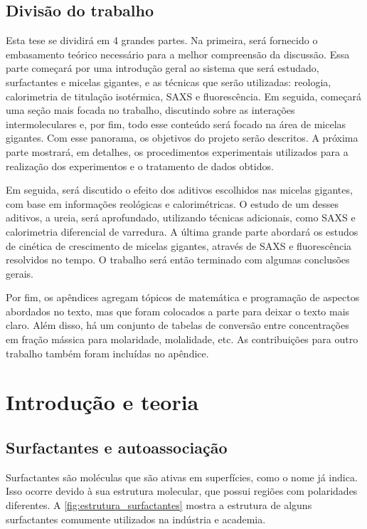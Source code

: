 
	\chapter*{Divisão do trabalho}
	
Esta tese se dividirá em 4 grandes partes. Na primeira, será fornecido o embasamento teórico necessário para a melhor compreensão da discussão. Essa parte começará por uma introdução geral ao sistema que será estudado, surfactantes e micelas gigantes, e as técnicas que serão utilizadas: reologia, calorimetria de titulação isotérmica, SAXS e fluorescência. Em seguida, começará uma seção mais focada no trabalho, discutindo sobre as interações intermoleculares e, por fim, todo esse conteúdo será focado na área de micelas gigantes. Com esse panorama, os objetivos do projeto serão descritos. A próxima parte mostrará, em detalhes, os procedimentos experimentais utilizados para a realização dos experimentos e o tratamento de dados obtidos.

Em seguida, será discutido o efeito dos aditivos escolhidos nas micelas gigantes, com base em informações reológicas e calorimétricas. O estudo de um desses aditivos, a ureia, será aprofundado, utilizando técnicas adicionais, como SAXS e calorimetria diferencial de varredura. A última grande parte abordará os estudos de cinética de crescimento de micelas gigantes, através de SAXS e fluorescência resolvidos no tempo. O trabalho será então terminado com algumas conclusões gerais.

Por fim, os apêndices agregam tópicos de matemática e programação de aspectos abordados no texto, mas que foram colocados a parte para deixar o texto mais claro. Além disso, há um conjunto de tabelas de conversão entre concentrações em fração mássica para molaridade, molalidade, etc. As contribuições para outro trabalho também foram incluídas no apêndice.

\part{Introdução e teoria}


	\chapter{Surfactantes e autoassociação}
	\label{sec:surfactantes_autoassociação}
	Surfactantes são moléculas que são ativas em superfícies, como o nome já indica.\cite{Lindman_livro} Isso ocorre devido à sua estrutura molecular, que possui regiões com polaridades diferentes. A \autoref{fig:estrutura_surfactantes} mostra a estrutura de alguns surfactantes comumente utilizados na indústria e academia.
	

